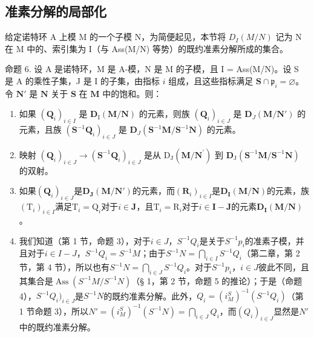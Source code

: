 \subsection{准素分解的局部化}

给定诺特环 A 上模 M 的一个子模 N，为简便起见，本节将 \(D_{I}(M/N)\) 记为 N 在 M 中的、索引集为 I（与 Ass(M/N) 等势）的既约准素分解所成的集合。

命题 6. 设 A 是诺特环，M 是 A-模，N 是 M 的子模，且 I = Ass(M/N)。设 S 是 A 的乘性子集，J 是 I 的子集，由指标 \(i\) 组成，且这些指标满足 \(\mathbf{S} \cap \mathfrak{p}_i = \varnothing\)。令 \(\mathbf{N}'\) 是 \(\mathbf{N}\) 关于 \(\mathbf{S}\) 在 \(\mathbf{M}\) 中的饱和。则：

\begin{enumerate}
\def\labelenumi{(\roman{enumi})}
\item
  如果 \((\mathbf{Q}_i)_{i\in I}\) 是 \(\mathbf{D}_{\mathrm{I}}(\mathbf{M} / \mathbf{N})\) 的元素，则族 \((\mathbf{Q}_i)_{i\in J}\) 是 \(\mathbf{D}_{J}(\mathbf{M} / \mathbf{N}')\) 的元素，且族 \((\mathbf{S}^{-1}\mathbf{Q}_i)_{i\in J}\) 是 \(\mathbf{D}_{J}(\mathbf{S}^{-1}\mathbf{M} / \mathbf{S}^{-1}\mathbf{N})\) 的元素。
\item
  映射 \((\mathbf{Q}_i)_{i\in J}\to (\mathbf{S}^{-1}\mathbf{Q}_i)_{i\in J}\) 是从 \(\mathrm{D}_{\mathrm{J}}(\mathbf{M} / \mathbf{N}^{\prime})\) 到 \(\mathbf{D}_{\mathrm{J}}(\mathbf{S}^{-1}\mathbf{M} / \mathbf{S}^{-1}\mathbf{N})\) 的双射。
\item
   如果\((\mathbf{Q}_i)_{i\in J}\)是\(\mathbf{D}_{\mathbf{J}}(\mathbf{M} / \mathbf{N}')\)的元素，而\((\mathbf{R}_i)_{i\in I}\)是\(\mathbf{D}_{\mathbf{I}}(\mathbf{M} / \mathbf{N})\)的元素，族\((\mathrm{T}_i)_{i\in I}\)满足\(\mathrm{T}_i = \mathrm{Q}_i\)对于\(i\in \mathbf{J}\)，且\(\mathrm{T}_i = \mathrm{R}_i\)对于\(i\in \mathbf{I} - \mathbf{J}\)的元素\(\mathbf{D}_{\mathbf{I}}(\mathbf{M} / \mathbf{N})\)。
\item
   我们知道（第 1 节，命题 3），对于\(i \in J\)，\(S^{-1}Q_{i}\)是关于\(S^{-1}p_{i}\)的准素子模，并且对于\(i \in I - J\)，\(S^{-1}Q_{i} = S^{-1}M\)；由于\(S^{-1}N = \bigcap_{i \in I} S^{-1}Q_{i}\)（第二章，第 2 节，第 4 节），所以也有\(S^{-1}N = \bigcap_{i \in J} S^{-1}Q_{i}\)。对于\(S^{-1}p_{i}\)，\(i \in J\)彼此不同，且其集合是\(\operatorname{Ass}(S^{-1}M / S^{-1}N)\)（§ 1，第 2 节，命题 5 的推论）；于是（命题 4），\(S^{-1}Q_{i})_{i \in J}\)是\(S^{-1}N\)的既约准素分解。此外，\(Q_{i} = (i_{M}^{S})^{-1}(S^{-1}Q_{i})\)（第 1 节命题 3），所以\(N' = (i_{M}^{S})^{-1}(S^{-1}N) = \bigcap_{i \in J} Q_{i}\)，而\((Q_{i})_{i \in J}\)显然是\(N'\)中的既约准素分解。

\end{enumerate}
